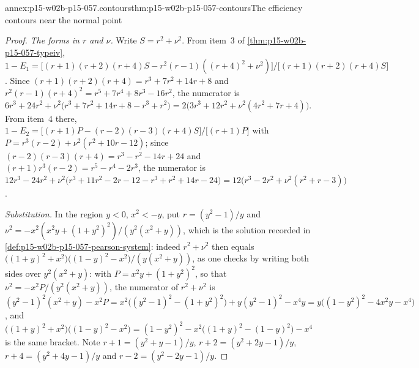 \begin{annexitem}{annex:p15-w02b-p15-057.contours}{thm:p15-w02b-p15-057-contours}{The efficiency contours near the normal point}
\begin{proof}
\emph{The forms in \(r\) and \(\nu\).} Write \(S=r^2+\nu^2\). From item~3
of \cref{thm:p15-w02b-p15-057-typeiv},
\(1-E_1=\bigl[(r+1)(r+2)(r+4)S-r^2(r-1)((r+4)^2+\nu^2)\bigr]/
\bigl[(r+1)(r+2)(r+4)S\bigr]\). Since
\((r+1)(r+2)(r+4)=r^3+7r^2+14r+8\) and
\(r^2(r-1)(r+4)^2=r^5+7r^4+8r^3-16r^2\), the numerator is
\(6r^3+24r^2+\nu^2\bigl(r^3+7r^2+14r+8-r^3+r^2\bigr)
=2\bigl(3r^3+12r^2+\nu^2(4r^2+7r+4)\bigr)\). From item~4 there,
\(1-E_2=\bigl[(r+1)P-(r-2)(r-3)(r+4)S\bigr]/\bigl[(r+1)P\bigr]\) with
\(P=r^3(r-2)+\nu^2(r^2+10r-12)\); since \((r-2)(r-3)(r+4)=r^3-r^2-14r+24\)
and \((r+1)r^3(r-2)=r^5-r^4-2r^3\), the numerator is
\(12r^3-24r^2+\nu^2\bigl(r^3+11r^2-2r-12-r^3+r^2+14r-24\bigr)
=12\bigl(r^3-2r^2+\nu^2(r^2+r-3)\bigr)\).

\emph{Substitution.} In the region \(y<0\), \(x^2<-y\), put
\(r=(y^2-1)/y\) and \(\nu^2=-x^2(x^2y+(1+y^2)^2)/(y^2(x^2+y))\), which is
the solution recorded in \cref{def:p15-w02b-p15-057-pearson-system}: indeed
\(r^2+\nu^2\) then equals
\(\bigl((1+y)^2+x^2\bigr)\bigl((1-y)^2-x^2\bigr)/(y(x^2+y))\), as one
checks by writing both sides over \(y^2(x^2+y)\): with
\(P=x^2y+(1+y^2)^2\), so that \(\nu^2=-x^2P/(y^2(x^2+y))\), the
numerator of \(r^2+\nu^2\) is \((y^2-1)^2(x^2+y)-x^2P
=x^2\bigl((y^2-1)^2-(1+y^2)^2\bigr)+y(y^2-1)^2-x^4y
=y\bigl((1-y^2)^2-4x^2y-x^4\bigr)\), and
\(\bigl((1+y)^2+x^2\bigr)\bigl((1-y)^2-x^2\bigr)
=(1-y^2)^2-x^2\bigl((1+y)^2-(1-y)^2\bigr)-x^4\) is the same bracket. Note \(r+1=(y^2+y-1)/y\),
\(r+2=(y^2+2y-1)/y\), \(r+4=(y^2+4y-1)/y\) and \(r-2=(y^2-2y-1)/y\).


\end{proof}
\end{annexitem}
